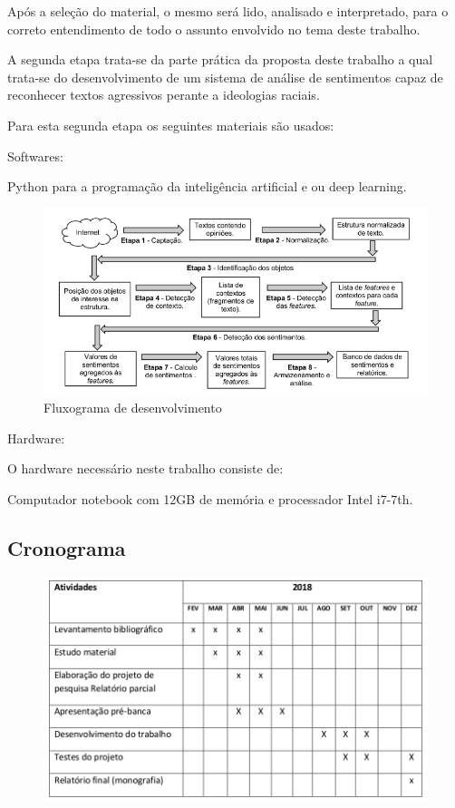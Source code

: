 \documentclass[12pt, a4paper]{article}
\begin{document}
Após a seleção do material, o mesmo será lido, analisado e interpretado, para o correto entendimento de todo o assunto envolvido no tema deste trabalho.

A segunda etapa trata-se da parte prática da proposta deste trabalho a qual trata-se do desenvolvimento de um sistema de análise de sentimentos capaz de reconhecer textos agressivos perante a ideologias raciais.

Para esta segunda etapa os seguintes materiais são usados:

Softwares:

Python para a programação da inteligência artificial e ou deep learning.

\begin{figure}[H]
\centering
\includegraphics[width=.8\textwidth]{fluxograma.png}
\caption{Fluxograma de desenvolvimento}
\label{fig:Fig4}
\end{figure}

Hardware:

O hardware necessário neste trabalho consiste de:

Computador notebook com 12GB de memória e processador Intel i7-7th.

\subsection{Cronograma}
\begin{figure}[H]
\centering
\includegraphics[width=1\textwidth]{cronograma.png}
\end{figure}
\end{document}
